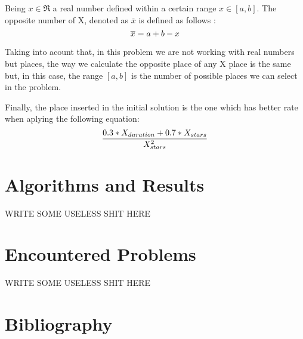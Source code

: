 \documentclass[preprint,14pt]{elsarticle}
\begin{document}
Being $x \in \Re $ a real number defined within a certain range $x \in [a,b]$. The opposite number of X, denoted as $\overline{x}$ is defined as follows \cite{obl}: \\
\begin{equation}\label{eq:w}
     \overline{x} = a + b - x  \\
 \end{equation}

 Taking into acount that, in this problem we are not working with real numbers but places, the way we calculate the opposite place of any X place is the same but, in this case, the range $[a, b]$ is the number of possible places we can select in the problem.

Finally, the place inserted in the initial solution is the one which has better rate when aplying the following equation: \\

\begin{equation}
    \frac{0.3 * X_{duration} + 0.7 * X_{stars}}{X_{stars}^{2}}    \\
 \end{equation}

\section{Algorithms and Results}
\label{S:algorithms}
WRITE SOME USELESS SHIT HERE

\section{Encountered Problems}
\label{S:problems}

WRITE SOME USELESS SHIT HERE

\section{Bibliography}



\end{document}
